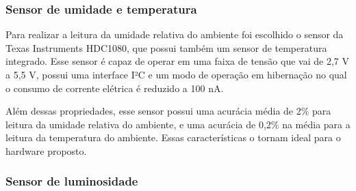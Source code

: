     \begin{figure}[h!]
            \captionsetup{width=9cm}
   \end{figure}   


\subsubsection{Sensor de umidade e temperatura}

Para realizar a leitura da umidade relativa do ambiente foi escolhido o sensor da Texas Instruments HDC1080, que possui também um sensor de temperatura integrado. Esse sensor é capaz de operar em uma faixa de tensão que vai de 2,7 V a 5,5 V, possui uma interface I²C e um modo de operação em hibernação no qual o consumo de corrente elétrica é reduzido a 100 nA.

Além dessas propriedades, esse sensor possui uma acurácia média de 2\% para leitura da umidade relativa do ambiente, e uma acurácia de 0,2\% na média para a leitura da temperatura do ambiente. Essas características o tornam ideal para o hardware proposto.

\subsubsection{Sensor de luminosidade}

